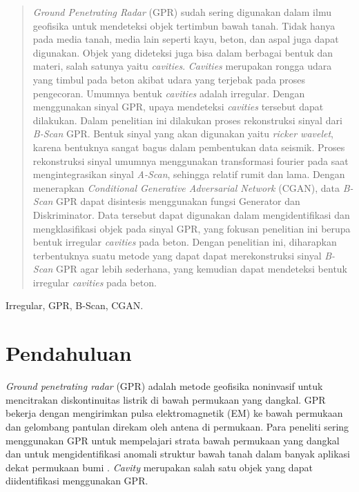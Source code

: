 \documentclass[conference]{IEEEtran}
\begin{document}
\maketitle

\begin{abstract}
\emph{Ground Penetrating Radar} (GPR) sudah sering digunakan dalam ilmu geofisika untuk mendeteksi objek tertimbun bawah tanah. 
Tidak hanya pada media tanah, media lain seperti kayu, beton, dan aspal juga dapat digunakan. 
Objek yang dideteksi juga bisa dalam berbagai bentuk dan materi, salah satunya yaitu \emph{cavities}. 
\emph{Cavities} merupakan rongga udara yang timbul pada beton akibat udara yang terjebak pada proses pengecoran. 
Umumnya bentuk \emph{cavities} adalah irregular. 
Dengan menggunakan sinyal GPR, upaya mendeteksi \emph{cavities} tersebut dapat dilakukan. 
Dalam penelitian ini dilakukan proses rekonstruksi sinyal dari \emph{B-Scan} GPR. 
Bentuk sinyal yang akan digunakan yaitu \emph{ricker wavelet}, karena bentuknya sangat bagus dalam pembentukan data seismik. 
Proses rekonstruksi sinyal umumnya menggunakan transformasi fourier pada saat mengintegrasikan sinyal \emph{A-Scan}, sehingga relatif rumit dan lama. 
Dengan menerapkan \emph{Conditional Generative Adversarial Network} (CGAN), data \emph{B-Scan} GPR dapat disintesis menggunakan fungsi Generator dan Diskriminator. 
Data tersebut dapat digunakan dalam mengidentifikasi dan mengklasifikasi objek pada sinyal GPR, yang fokusan penelitian ini berupa bentuk irregular \emph{cavities} pada beton. 
Dengan penelitian ini, diharapkan terbentuknya suatu metode yang dapat dapat merekonstruksi sinyal \emph{B-Scan} GPR agar lebih sederhana, yang kemudian dapat mendeteksi bentuk irregular \emph{cavities} pada beton.
\end{abstract}

\begin{IEEEkeywords}
Irregular, GPR, B-Scan, CGAN.
\end{IEEEkeywords}

\section{Pendahuluan}
\emph{Ground penetrating radar} (GPR) adalah metode geofisika noninvasif untuk mencitrakan diskontinuitas listrik di bawah permukaan yang dangkal. 
GPR bekerja dengan mengirimkan pulsa elektromagnetik (EM) ke bawah permukaan dan gelombang pantulan direkam oleh antena di permukaan. 
Para peneliti sering menggunakan GPR untuk mempelajari strata bawah permukaan yang dangkal dan untuk mengidentifikasi anomali struktur bawah tanah dalam banyak aplikasi dekat permukaan bumi \cite{a1}. 
\emph{Cavity} merupakan salah satu objek yang dapat diidentifikasi menggunakan GPR.
\end{document}
